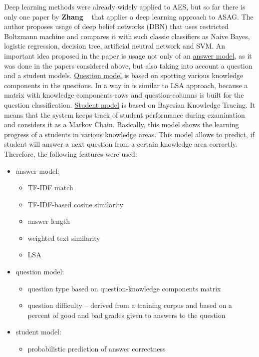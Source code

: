 Deep learning methods were already widely applied to AES, but so far there is only one paper by \textbf{Zhang} ~\cite{Zhang} that applies a deep learning approach to ASAG. The author proposes usage of deep belief networks (DBN) that uses restricted Boltzmann machine and compares it with such classic classifiers as Naive Bayes, logistic regression, decision tree, artificial neutral network and SVM. An important idea proposed in the paper is usage not only of an \underline{answer model}, as it was done in the papers considered above, but also taking into account a question and a student models. \underline{Question model} is based on spotting various knowledge components in the questions. In a way in is similar to LSA approach, because a matrix with knowledge components-rows and question-columns is built for the question classification. \underline{Student model} is based on Bayesian Knowledge Tracing. It means that the system keeps track of student performance during examination and considers it as a Markov Chain. Basically, this model shows the learning progress of a students in various knowledge areas. This model allows to predict, if student will answer a next question from a certain knowledge area correctly. Therefore, the following features were used:
\begin{itemize}
\item answer model:
\begin{itemize}
\item TF-IDF match
\item TF-IDF-based cosine similarity
\item answer length
\item weighted text similarity
\item LSA
\end{itemize}
\item question model:
\begin{itemize}
\item question type based on question-knowledge components matrix
\item question difficulty -- derived from a training corpus and based on a percent of good and bad grades given to answers to the question
\end{itemize}
\item student model:
\begin{itemize}
\item probabilistic prediction of answer correctness
\end{itemize}
\end{itemize}

